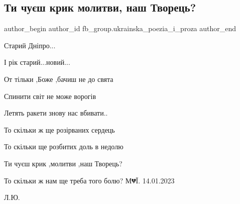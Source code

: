  
 
 
 
 

\subsection{Ти чуєш крик молитви, наш Творець?}
\label{sec:14_01_2023.fb.fb_group.ukrainska_poezia_i_proza.1.ti_chu_sh_krik_molit}

\ifcmt
 author_begin
   author_id fb_group.ukrainska_poezia_i_proza
 author_end
\fi

Старий Дніпро...

І рік старий...новий...

От тільки ,Боже ,бачиш не до свята

Спинити світ не може ворогів

Летять ракети знову нас вбивати..

То скільки ж ще розірваних сердець 

То скільки ще розбитих доль в недолю

Ти чуєш крик ,молитви ,наш Творець?

То скільки ж нам ще треба того болю?
М💔Ї. 14.01.2023

Л.Ю.
